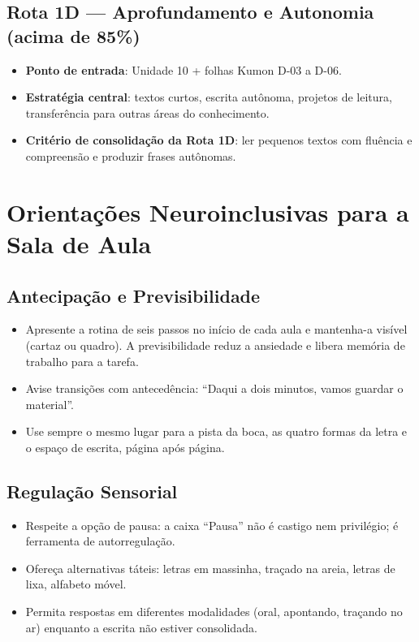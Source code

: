 \subsection{Rota 1D --- Aprofundamento e Autonomia (acima de 85\%)}

\begin{itemize}
  \item \textbf{Ponto de entrada}: Unidade 10 + folhas Kumon D-03 a D-06.
  \item \textbf{Estratégia central}: textos curtos, escrita autônoma, projetos
        de leitura, transferência para outras áreas do conhecimento.
  \item \textbf{Critério de consolidação da Rota 1D}: ler pequenos textos com
        fluência e compreensão e produzir frases autônomas.
\end{itemize}


\section{Orientações Neuroinclusivas para a Sala de Aula}

\subsection{Antecipação e Previsibilidade}

\begin{itemize}
  \item Apresente a rotina de seis passos no início de cada aula e mantenha-a
        visível (cartaz ou quadro). A previsibilidade reduz a ansiedade e
        libera memória de trabalho para a tarefa.
  \item Avise transições com antecedência: ``Daqui a dois minutos, vamos
        guardar o material''.
  \item Use sempre o mesmo lugar para a pista da boca, as quatro formas da
        letra e o espaço de escrita, página após página.
\end{itemize}

\subsection{Regulação Sensorial}

\begin{itemize}
  \item Respeite a opção de pausa: a caixa ``Pausa'' não é castigo nem
        privilégio; é ferramenta de autorregulação.
  \item Ofereça alternativas táteis: letras em massinha, traçado na areia,
        letras de lixa, alfabeto móvel.
  \item Permita respostas em diferentes modalidades (oral, apontando,
        traçando no ar) enquanto a escrita não estiver consolidada.
\end{itemize}

